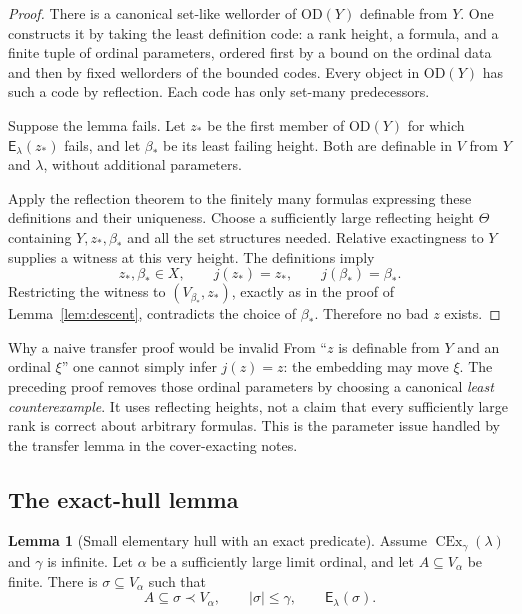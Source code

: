 \documentclass[11pt,letterpaper]{article}
\theoremstyle{definition}
\newtheorem{lemma}[definition]{Lemma}
\newcommand{\OD}{\mathrm{OD}}
\newcommand{\CEx}{\operatorname{CEx}}
\newcommand{\Erel}{\mathsf{E}}
\begin{document}
\begin{proof}
There is a canonical set-like wellorder of $\OD(Y)$ definable from $Y$. One constructs it by taking the least definition code: a rank height, a formula, and a finite tuple of ordinal parameters, ordered first by a bound on the ordinal data and then by fixed wellorders of the bounded codes. Every object in $\OD(Y)$ has such a code by reflection. Each code has only set-many predecessors.

Suppose the lemma fails. Let $z_*$ be the first member of $\OD(Y)$ for which $\Erel_\lambda(z_*)$ fails, and let $\beta_*$ be its least failing height. Both are definable in $V$ from $Y$ and $\lambda$, without additional parameters.

Apply the reflection theorem to the finitely many formulas expressing these definitions and their uniqueness. Choose a sufficiently large reflecting height $\Theta$ containing $Y,z_*,\beta_*$ and all the set structures needed. Relative exactingness to $Y$ supplies a witness at this very height. The definitions imply
\[
 z_*,\beta_*\in X,
 \qquad j(z_*)=z_* ,\qquad j(\beta_*)=\beta_*.
\]
Restricting the witness to $(V_{\beta_*},z_*)$, exactly as in the proof of Lemma~\ref{lem:descent}, contradicts the choice of $\beta_*$. Therefore no bad $z$ exists.
\end{proof}

\begin{assessment}{Why a naive transfer proof would be invalid}
From ``$z$ is definable from $Y$ and an ordinal $\xi$'' one cannot simply infer $j(z)=z$: the embedding may move $\xi$. The preceding proof removes those ordinal parameters by choosing a canonical \emph{least counterexample}. It uses reflecting heights, not a claim that every sufficiently large rank is correct about arbitrary formulas. This is the parameter issue handled by the transfer lemma in the cover-exacting notes.\cite{cover}
\end{assessment}

\subsection{The exact-hull lemma}

\begin{lemma}[Small elementary hull with an exact predicate]\label{lem:hull}
Assume $\CEx_\gamma(\lambda)$ and $\gamma$ is infinite. Let $\alpha$ be a sufficiently large limit ordinal, and let $A\subseteq V_\alpha$ be finite. There is $\sigma\subseteq V_\alpha$ such that
\[
 A\subseteq\sigma\prec V_\alpha,
 \qquad |\sigma|\leq\gamma,
 \qquad \Erel_\lambda(\sigma).
\]
\end{lemma}
\end{document}

